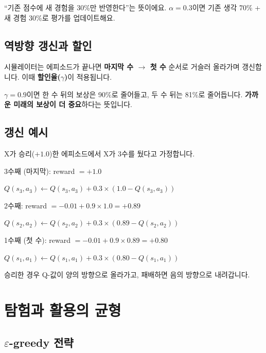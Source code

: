 \documentclass[11pt,a4paper]{article}
\begin{document}
\begin{tipbox}
``기존 점수에 새 경험을 30\%만 반영한다''는 뜻이에요. $\alpha=0.3$이면 기존 생각 70\% + 새 경험 30\%로 평가를 업데이트해요.
\end{tipbox}

\subsection{역방향 갱신과 할인}

시뮬레이터는 에피소드가 끝나면 \textbf{마지막 수 $\to$ 첫 수} 순서로 거슬러 올라가며 갱신합니다. 이때 \textbf{할인율($\gamma$)}이 적용됩니다.

$\gamma=0.9$이면 한 수 뒤의 보상은 90\%로 줄어들고, 두 수 뒤는 81\%로 줄어듭니다. \textbf{가까운 미래의 보상이 더 중요}하다는 뜻입니다.

\subsection{갱신 예시}

X가 승리($+1.0$)한 에피소드에서 X가 3수를 뒀다고 가정합니다.

\begin{codebox}
3수째 (마지막): reward $= +1.0$

\quad $Q(s_3, a_3) \leftarrow Q(s_3, a_3) + 0.3 \times (1.0 - Q(s_3, a_3))$

2수째: reward $= -0.01 + 0.9 \times 1.0 = +0.89$

\quad $Q(s_2, a_2) \leftarrow Q(s_2, a_2) + 0.3 \times (0.89 - Q(s_2, a_2))$

1수째 (첫 수): reward $= -0.01 + 0.9 \times 0.89 = +0.80$

\quad $Q(s_1, a_1) \leftarrow Q(s_1, a_1) + 0.3 \times (0.80 - Q(s_1, a_1))$
\end{codebox}

승리한 경우 Q-값이 양의 방향으로 올라가고, 패배하면 음의 방향으로 내려갑니다.

\section{탐험과 활용의 균형}

\subsection{$\varepsilon$-greedy 전략}
\end{document}
